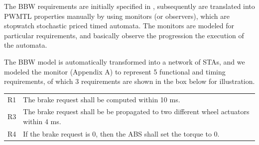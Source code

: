 The BBW requirements are initially specified in \resa, subsequently are translated into PWMTL properties manually by using monitors (or observers), which are stopwatch stochastic priced timed automata. The monitors are modeled for particular requirements, and basically observe the progression the execution of the automata.
\begin{example}\label{ex_resa}
	The BBW model is automatically transformed into a network of STAs, and we modeled the monitor (Appendix A) to represent 5 functional and timing requirements, of which 3 requirements are shown in the box below for illustration. \vspace{0.2cm}
\begin{elaboration}{0.9}
	\small
	{}
	\begin{tabular}{lp{}}
	R1 & The brake request shall be computed within 10 ms. \\
	R3 & The brake request shall be be propagated to two different wheel actuators within 4 ms.\\
	R4 & If the brake request is 0, then the ABS shall set the torque to 0. \\
\end{tabular}
\end{elaboration}
\end{example}

